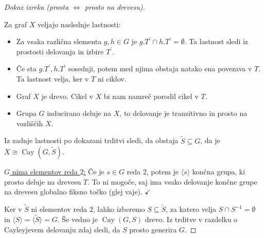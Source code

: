 \documentclass[11pt]{book}
\DeclareMathOperator\Cay{Cay}
\def\literatura{\color{modra}}
\def\vaje{{\literatura (glej vaje)}}
\def\kljuka{$\checkmark$}
\theoremstyle{definition}
\theoremstyle{zgled}
\theoremstyle{odprtproblem}
\theoremstyle{domacanaloga}
\newenvironment{dokaz}
    {\color{siva}\begin{proof}}
    {\end{proof}}
\theoremstyle{izrek}
\begin{document}
\begin{dokaz}[Dokaz izreka {\sc (prosta $\Leftrightarrow$ prosto na drevesu)}]
\begin{figure}[h]
\end{figure}

Za graf $X$ veljajo naslednje lastnosti:
\begin{itemize}
    \item Za vsaka različna elementa $g, h \in G$ je $g.T^\prime \cap h.T^\prime = \emptyset$. Ta lastnost sledi iz prostosti delovanja in izbire $T^\prime$. 
    \item Če sta $g.T^\prime, h.T^\prime$ sosednji, potem med njima obstaja natako ena povezava v $T$. Ta lastnost velja, ker v $T$ ni ciklov.
    \item Graf $X$ je drevo. Cikel v $X$ bi nam namreč porodil cikel v $T$.
    \item Grupa $G$ inducirano deluje na $X$, to delovanje je tranzitivno in prosto na vozliščih $X$.
\end{itemize}
Iz zadnje lastnosti po dokazani trditvi sledi, da obstaja $\tilde S \subseteq G$, da je $X \cong \Cay(G,\tilde S)$. 

\underline{$G$ nima elementov reda $2$:} Če je $s \in G$ reda $2$, potem je $\langle s \rangle$ končna grupa, ki prosto deluje na drevesu $T$. To ni mogoče, saj ima vsako delovanje končne grupe na drevesu globalno fiksno točko \vaje. \kljuka

Ker v $\tilde S$ ni elementov reda $2$, lahko izberemo $S \subseteq \tilde S$, za katero velja $S \cap S^{-1} = \emptyset$ in $\langle S \rangle = \langle \tilde S \rangle = G$. Še vedno je $\Cay(G,S)$ drevo. Iz trditve v razdelku o Cayleyjevem delovanju zdaj sledi, da $S$ prosto generira $G$.
\end{dokaz}
\end{document}

